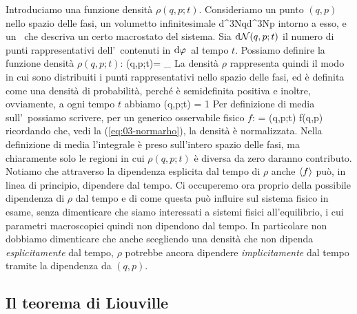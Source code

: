 Introduciamo una funzione densità $\rho(q,p;t)$. Consideriamo un punto $(q,p)$ nello spazio delle fasi, un volumetto infinitesimale
\be
\dephi \equiv \mbox{d}^{3N}q\;\mbox{d}^{3N}p
\ee
intorno a esso, e un \ensemble\ che descriva un certo macrostato del sistema.
Sia ${\textrm d}{\mathcal N}(q,p;t)$ il numero di punti rappresentativi dell'\ensemble\ contenuti in ${\textrm d}\varphi\,$ al tempo $t$.
Possiamo definire la funzione densità $\rho(q,p;t)$:
\be
\rho(q,p;t)\dephi = \lim_{\calN\to\infty}
\ee
La densità $\rho$ rappresenta quindi il modo in cui sono distribuiti i punti rappresentativi nello spazio delle fasi, ed è definita come una densità di probabilità, perché è semidefinita positiva e inoltre, ovviamente, a ogni tempo $t$ abbiamo
\be
\label{eq:03-normarho}
\int\dephi\rho(q,p;t) = 1
\ee
Per definizione di media sull'\ensemble\ possiamo scrivere, per un generico osservabile fisico $f$:
\be
{} = \int\dephi \rho(q,p;t) f(q,p)
\ee
ricordando che, vedi la (\ref{eq:03-normarho}), la densità è normalizzata.
Nella definizione di media l'integrale è preso sull'intero spazio delle fasi, ma chiaramente solo le regioni in cui $\rho(q,p;t)$ è diversa da zero daranno contributo. Notiamo che attraverso la dipendenza esplicita dal tempo di $\rho$ anche $\langle f\rangle$ può, in linea di principio, dipendere dal tempo. Ci occuperemo ora proprio della possibile dipendenza di $\rho$ dal tempo e di come questa può influire sul sistema fisico in esame, senza dimenticare che siamo interessati a sistemi fisici all'equilibrio, i cui parametri macroscopici quindi non dipendono dal tempo. In particolare non dobbiamo dimenticare che anche scegliendo una densità che non dipenda {\em esplicitamente} dal tempo, $\rho$ potrebbe ancora dipendere {\em implicitamente} dal tempo tramite la dipendenza da $(q,p)$.

\subsection{Il teorema di Liouville}



